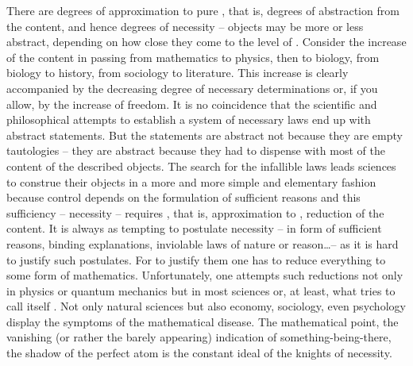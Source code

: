 \pa There are degrees of approximation to pure , that
is, degrees of abstraction from the  content, and hence degrees of
necessity -- objects may be more or less abstract, depending on how close they
come to the level of .  Consider the increase of the 
content in passing from mathematics to physics, then to biology, from biology to
history, from sociology to literature.  This increase is clearly accompanied by
the decreasing degree of necessary determinations or, if you allow, by the
increase of freedom.  It is no coincidence that the scientific and philosophical
attempts to establish a system of necessary laws end up with abstract
statements.  But the statements are abstract not because they are empty
tautologies -- they are abstract because they had to dispense with most of the
 content of the described objects.  The search for the infallible
laws leads sciences to construe their objects in a more and more simple and
elementary fashion because control depends on the formulation of sufficient
reasons and this sufficiency -- necessity -- requires , that is,
approximation to , reduction of the  content.  It is
always as tempting to postulate necessity -- in form of sufficient reasons,
binding explanations, inviolable laws of nature or reason\ldots -- as it is hard to
justify such postulates. For to justify them one has to reduce everything to
some form of mathematics.  Unfortunately, one attempts such reductions not only
in physics or quantum mechanics but in most sciences or, at least, what
tries to call itself .  Not only natural sciences but also economy,
sociology, even psychology display the symptoms of the mathematical disease.
The mathematical point, the vanishing (or rather the barely appearing)
indication of something-being-there, the shadow of the perfect atom is the constant
ideal of the knights of necessity.

